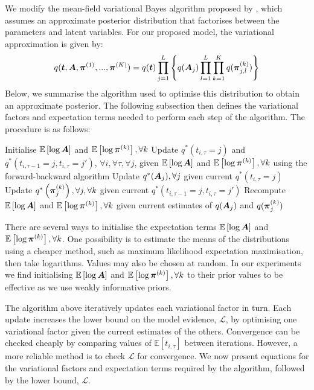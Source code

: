 We modify the mean-field variational Bayes algorithm proposed by \cite{simpsonlong}, 
which assumes an approximate posterior distribution that factorises between the parameters and 
latent variables. For our proposed model, the variational approximation is given by:
\begin{equation}
  q(\boldsymbol t, \boldsymbol A, \boldsymbol\pi^{(1)},...,\boldsymbol\pi^{(K)}) = q(\boldsymbol t)\prod_{j=1}^L \left\{ q(\boldsymbol A_j)\prod_{l=1}^L \prod_{k=1}^K  q(\boldsymbol\pi_{j,l}^{(k)}) \right\}
\end{equation}
Below, we summarise the algorithm used to optimise this distribution to obtain an approximate posterior.
The following subsection then defines the variational factors and expectation terms needed to perform each step of the algorithm. The procedure is as follows:
\begin{algorithm}
 Initialise $\mathbb{E}\left[\log \boldsymbol A \right]$ 
 and $\mathbb{E}\left[\log\boldsymbol\pi^{(k)} \right], \forall k$\;
 {
 Update $q^*(t_{i,\tau}=j)$ and $q^*(t_{i,\tau-1}=j, t_{i,\tau}=j')$, $\forall i,\forall \tau,\forall j$,
 given $\mathbb{E}\left[\log \boldsymbol A \right]$ and 
 $\mathbb{E}\left[\log\boldsymbol\pi^{(k)} \right], \forall k$
 using the forward-backward algorithm\;
 Update $q^*(\boldsymbol A_j), \forall j$ given current $q^*(t_{i,\tau}=j)$\;
 Update $q^*\left(\boldsymbol\pi_j^{(k)}\right), \forall j, \forall k$ given current $q^*(t_{i,\tau-1}=j, t_{i,\tau}=j')$\;
 Recompute $\mathbb{E}\left[\log \boldsymbol A \right]$ 
 and $\mathbb{E}\left[\log\boldsymbol\pi^{(k)} \right], \forall k$ given current estimates of
 $q(\boldsymbol A_j)$ and $q(\boldsymbol\pi_j^{(k)})$\; 
 }
\end{algorithm}

There are several ways to initialise the expectation terms $\mathbb{E}\left[\log \boldsymbol A \right]$ 
 and $\mathbb{E}\left[\log\boldsymbol\pi^{(k)} \right], \forall k$. One possibility is to estimate the means 
 of the distributions using a cheaper method, such as maximum likelihood expectation maximisation, then
 take logarithms. Values may also be chosen at random.
  In our experiments we find initialising $\mathbb{E}\left[\log \boldsymbol A \right]$ 
 and $\mathbb{E}\left[\log\boldsymbol\pi^{(k)} \right], \forall k$ to their prior values to be effective
 as we use weakly informative priors.
 
The algorithm above iteratively updates each variational factor in turn. Each update increases the lower bound on the model evidence, $\mathcal{L}$, by optimising one variational factor given the current estimates of the others.  
Convergence can be checked cheaply by comparing values of $\mathbb{E}[t_{i,\tau}]$ between iterations. However, a more reliable method is to check $\mathcal{L}$ for convergence. We now present equations for the variational factors and expectation terms required by the algorithm, followed by the lower bound, $\mathcal{L}$. 

